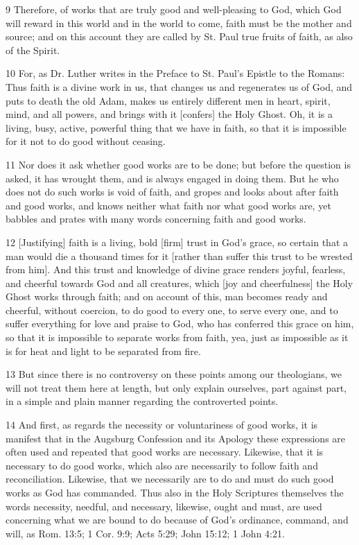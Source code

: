 9 Therefore, of works that are truly good and well-pleasing to God, which God will reward in this world and in the world to come, faith must be the mother and source; and on this account they are called by St. Paul true fruits of faith, as also of the Spirit.

10 For, as Dr. Luther writes in the Preface to St. Paul’s Epistle to the Romans: Thus faith is a divine work in us, that changes us and regenerates us of God, and puts to death the old Adam, makes us entirely different men in heart, spirit, mind, and all powers, and brings with it [confers] the Holy Ghost. Oh, it is a living, busy, active, powerful thing that we have in faith, so that it is impossible for it not to do good without ceasing.

11 Nor does it ask whether good works are to be done; but before the question is asked, it has wrought them, and is always engaged in doing them. But he who does not do such works is void of faith, and gropes and looks about after faith and good works, and knows neither what faith nor what good works are, yet babbles and prates with many words concerning faith and good works.

12 [Justifying] faith is a living, bold [firm] trust in God’s grace, so certain that a man would die a thousand times for it [rather than suffer this trust to be wrested from him]. And this trust and knowledge of divine grace renders joyful, fearless, and cheerful towards God and all creatures, which [joy and cheerfulness] the Holy Ghost works through faith; and on account of this, man becomes ready and cheerful, without coercion, to do good to every one, to serve every one, and to suffer everything for love and praise to God, who has conferred this grace on him, so that it is impossible to separate works from faith, yea, just as impossible as it is for heat and light to be separated from fire.

13 But since there is no controversy on these points among our theologians, we will not treat them here at length, but only explain ourselves, part against part, in a simple and plain manner regarding the controverted points.

14 And first, as regards the necessity or voluntariness of good works, it is manifest that in the Augsburg Confession and its Apology these expressions are often used and repeated that good works are necessary. Likewise, that it is necessary to do good works, which also are necessarily to follow faith and reconciliation. Likewise, that we necessarily are to do and must do such good works as God has commanded. Thus also in the Holy Scriptures themselves the words necessity, needful, and necessary, likewise, ought and must, are used concerning what we are bound to do because of God’s ordinance, command, and will, as Rom. 13:5; 1 Cor. 9:9; Acts 5:29; John 15:12; 1 John 4:21.

